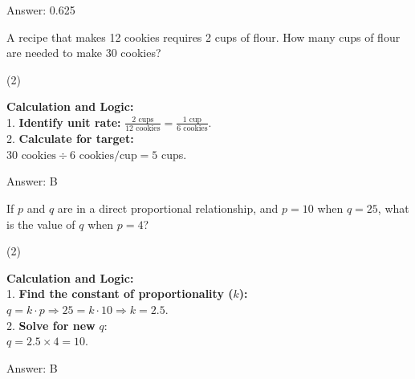 \documentclass[11pt,paper=a4,answers]{exam}
\begin{document}
\begin{questions}
\begin{solution}
\vspace{30pt}

Answer: \colorbox{yellow!100}{0.625}
\end{solution}

\vspace{60pt}

\question
A recipe that makes 12 cookies requires 2 cups of flour. How many cups of flour are needed to make 30 cookies?
\begin{tasks}(2)
\end{tasks}

\begin{solution}
\textbf{Calculation and Logic:} \\
1. \textbf{Identify unit rate:} $\frac{2 \text{ cups}}{12 \text{ cookies}} = \frac{1 \text{ cup}}{6 \text{ cookies}}$. \\
2. \textbf{Calculate for target:} \\
$30 \text{ cookies} \div 6 \text{ cookies/cup} = 5$ cups.

\vspace{30pt}

Answer: \colorbox{yellow!100}{B}
\end{solution}

\vspace{60pt}

\question
If $p$ and $q$ are in a direct proportional relationship, and $p = 10$ when $q = 25$, what is the value of $q$ when $p = 4$?
\begin{tasks}(2)
\end{tasks}

\begin{solution}
\textbf{Calculation and Logic:} \\
1. \textbf{Find the constant of proportionality ($k$):} \\
$q = k \cdot p \Rightarrow 25 = k \cdot 10 \Rightarrow k = 2.5$. \\
2. \textbf{Solve for new } $q$: \\
$q = 2.5 \times 4 = 10$.

\vspace{30pt}

Answer: \colorbox{yellow!100}{B}
\end{solution}


\end{questions}
\end{document}
